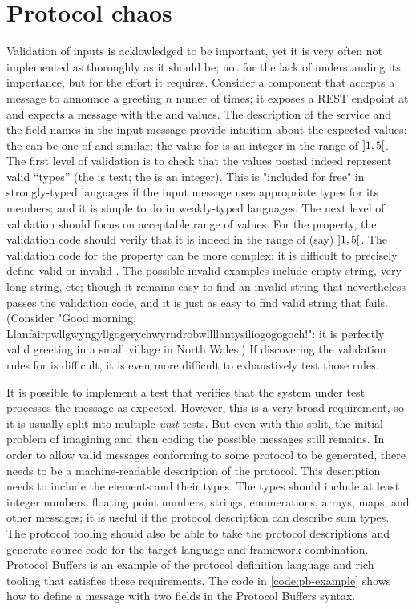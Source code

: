 \section{Protocol chaos}
Validation of inputs is acklowledged to be important, yet it is very often not implemented as thoroughly as it should be; not for the lack of understanding its importance, but for the effort it requires. Consider a component that accepts a message to announce a greeting $n$ numer of times; it exposes a REST endpoint at  and expects a message with the  and  values. The description of the service and the field names in the input message provide intuition about the expected values: the  can be one of  and similar; the value for  is an integer in the range of $\interval[open]{1}{5}$. The first level of validation is to check that the values posted indeed represent valid ``types'' (the  is text; the  is an integer). This is "included for free" in strongly-typed languages if the input message uses appropriate types for its members; and it is simple to do in weakly-typed languages. The next level of validation should focus on acceptable range of values. For the  property, the validation code should verify that it is indeed in the range of (say) $\interval[open]{1}{5}$. The validation code for the  property can be more complex: it is difficult to precisely define valid or invalid . The possible invalid examples include empty string, very long string, etc; though it remains easy to find an invalid string that nevertheless passes the validation code, and it is just as easy to find valid string that fails. (Consider "Good morning, Llanfairpwllgwyngyllgogerychwyrndrobwllllantysiliogogogoch!": it is perfectly valid greeting in a small village in North Wales.) If discovering the validation rules for  is difficult, it is even more difficult to exhaustively test those rules. 

It is possible to implement a test that verifies that the system under test processes the message as expected. However, this is a very broad requirement, so it is usually split into multiple \emph{unit} tests. But even with this split, the initial problem of imagining and then coding the possible messages still remains. In order to allow valid messages conforming to some protocol to be generated, there needs to be a machine-readable description of the protocol. This description needs to include the elements and their types. The types should include at least integer numbers, floating point numbers, strings, enumerations, arrays, maps, and other messages; it is useful if the protocol description can describe sum types. The protocol tooling should also be able to take the protocol descriptions and generate source code for the target language and framework combination. Protocol Buffers \cite{protobuf} is an example of the protocol definition language and rich tooling that satisfies these requirements. The code in \autoref{code:pb-example} shows how to define a message  with two fields in the Protocol Buffers syntax.

